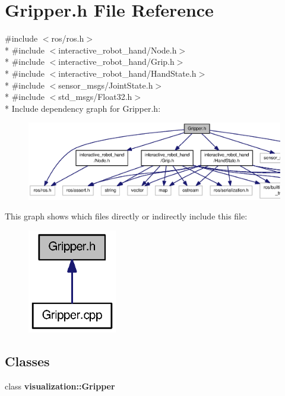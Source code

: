 \section{Gripper.\-h File Reference}
\label{Gripper_8h}
{\ttfamily \#include $<$ros/ros.\-h$>$}\\*
{\ttfamily \#include $<$interactive\-\_\-robot\-\_\-hand/\-Node.\-h$>$}\\*
{\ttfamily \#include $<$interactive\-\_\-robot\-\_\-hand/\-Grip.\-h$>$}\\*
{\ttfamily \#include $<$interactive\-\_\-robot\-\_\-hand/\-Hand\-State.\-h$>$}\\*
{\ttfamily \#include $<$sensor\-\_\-msgs/\-Joint\-State.\-h$>$}\\*
{\ttfamily \#include $<$std\-\_\-msgs/\-Float32.\-h$>$}\\*
Include dependency graph for Gripper.\-h\-:\nopagebreak
\begin{figure}[H]
\begin{center}
\leavevmode
\includegraphics[width=350pt]{Gripper_8h__incl}
\end{center}
\end{figure}
This graph shows which files directly or indirectly include this file\-:\nopagebreak
\begin{figure}[H]
\begin{center}
\leavevmode
\includegraphics[width=110pt]{Gripper_8h__dep__incl}
\end{center}
\end{figure}
\subsection*{Classes}
\begin{DoxyCompactItemize}
\item 
class {\bf visualization\-::\-Gripper}
\end{DoxyCompactItemize}
